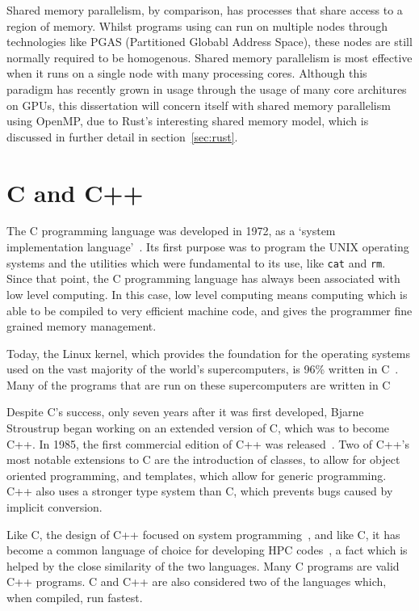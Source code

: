 Shared memory parallelism, by comparison, has processes that share access to a region of memory. Whilst programs using can run on multiple nodes through technologies like PGAS (Partitioned Globabl Address Space), these nodes are still normally required to be homogenous. Shared memory parallelism is most effective when it runs on a single node with many processing cores. Although this paradigm has recently grown in usage through the usage of many core architures on GPUs, this dissertation will concern itself with shared memory parallelism using OpenMP, due to Rust's interesting shared memory model, which is discussed in further detail in section~\ref{sec:rust}.

\section{C and C++}
The C programming language was developed in 1972, as a `system implementation language'~\cite{Ritchie:1993}. Its first purpose was to program the UNIX operating systems and the utilities which were fundamental to its use, like \texttt{cat} and \texttt{rm}. Since that point, the C programming language has always been associated with low level computing. In this case, low level computing means computing which is able to be compiled to very efficient machine code, and gives the programmer fine grained memory management.

Today, the Linux kernel, which provides the foundation for the operating systems used on the vast majority of the world's supercomputers, is 96\% written in C~\cite{LinuxKernel}. Many of the programs that are run on these supercomputers are written in C~\cite{fftw, ffs, foam}

Despite C's success, only seven years after it was first developed, Bjarne Stroustrup began working on an extended version of C, which was to become C++. In 1985, the first commercial edition of C++ was released~\cite{CPPFAQS}. Two of C++'s most notable extensions to C are the introduction of classes, to allow for object oriented programming, and templates, which allow for generic programming. C++ also uses a stronger type system than C, which prevents bugs caused by implicit conversion.

Like C, the design of C++ focused on system programming~\cite{CplusEssence}, and like C, it has become a common language of choice for developing HPC codes~\cite{foam}, a fact which is helped by the close similarity of the two languages. Many C programs are valid C++ programs. C and C++ are also considered two of the languages which, when compiled, run fastest.

